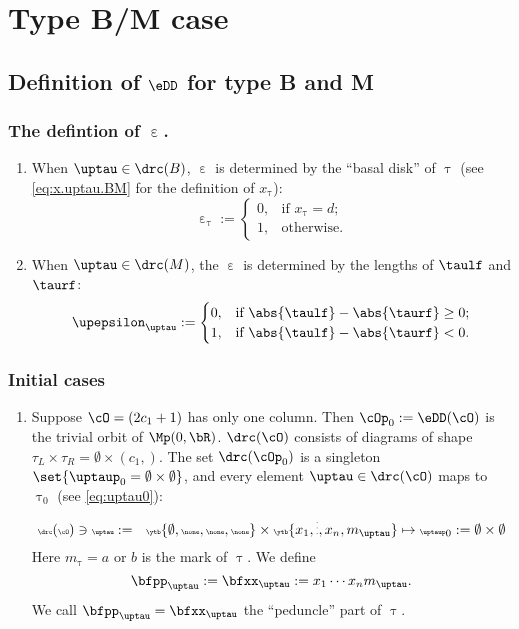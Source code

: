 \documentclass[ssunip]{subfiles}
\begin{document}
\section{Type B/M case}

\subsection{Definition of $\eDD$ for type B and M}

\subsubsection{The defintion of $\upepsilon$.} \label{sec:upepsilon.BM}
\begin{enumerate}[label=(\arabic*).,series=alg2]
  \item When $\uptau\in \drc(B)$, $\upepsilon$ is determined by the ``basal
  disk'' of $\uptau$ (see \eqref{eq:x.uptau.BM} for the definition of $x_{\uptau}$):
  \[
    \upepsilon_{\uptau}:=
    \begin{cases}
      0, & \text{if $x_{\uptau}=d$;} \\
      1, & \text{otherwise.}
    \end{cases}
  \]
  \item When $\uptau\in \drc(M)$, the  $\upepsilon$  is determined by
  the lengths of $\taulf$ and $\taurf$:
  \[
    \upepsilon_{\uptau} :=
    \begin{cases}
      0, & \text{if }\abs{\taulf} - \abs{\taurf} \geq  0;\\
      1, & \text{if }\abs{\taulf} - \abs{\taurf}<0.
    \end{cases}
  \]
\end{enumerate}


\subsubsection{Initial cases}

\begin{enumerate}[resume*=alg2]
  \item Suppose $\cO = (2c_{1}+1)$ has only one column. Then
        $\cOp_{0}:=\eDD(\cO)$ is the trivial orbit of $\Mp(0,\bR)$. $\drc(\cO)$
        consists of diagrams of shape
        $\tau_{L}\times \tau_{R} =\emptyset\times (c_{1},)$.
        The set $\drc(\cOp_{0})$ is a singleton $\set{\uptaup_{0}=\emptyset\times \emptyset}$, and every element
        $\uptau \in \drc(\cO)$ maps to $\uptau_{0}$ (see \eqref{eq:uptau0}):
        \[\tiny
          \drc(\cO)\ni \uptau:= \hspace{1em} \ytb{\emptyset,\none,\none,\none}
          \times \ytb{{x_{1}},\vdots,{x_{n}},{m_{\uptau}}}
          \mapsto \uptaup_{0}:=\emptyset\times \emptyset
        \]
        Here $m_{\uptau}=a$ or $b$ is the mark of $\uptau$.
        We define
        \[
          \bfpp_{\uptau}:=\bfxx_{\uptau} := x_{1}\cdots x_{n} m_{\uptau}.%
        \]
        We call $\bfpp_{\uptau}=\bfxx_{\uptau}$ the ``peduncle'' part of
        $\uptau$.
\end{enumerate}
\end{document}
